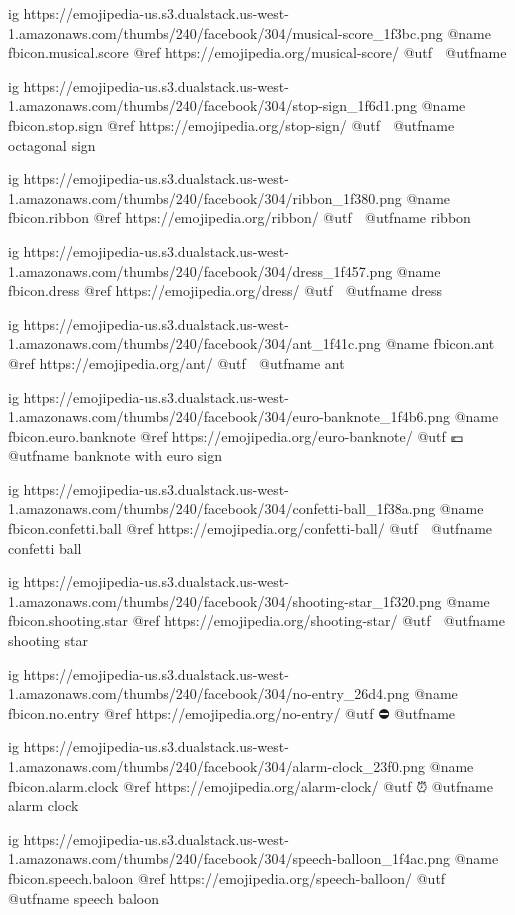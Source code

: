   ig https://emojipedia-us.s3.dualstack.us-west-1.amazonaws.com/thumbs/240/facebook/304/musical-score_1f3bc.png
  @name fbicon.musical.score
  @ref https://emojipedia.org/musical-score/
  @utf 🎼
  @utfname

  ig https://emojipedia-us.s3.dualstack.us-west-1.amazonaws.com/thumbs/240/facebook/304/stop-sign_1f6d1.png
  @name fbicon.stop.sign
  @ref https://emojipedia.org/stop-sign/
  @utf 🛑
  @utfname octagonal sign

  ig https://emojipedia-us.s3.dualstack.us-west-1.amazonaws.com/thumbs/240/facebook/304/ribbon_1f380.png
  @name fbicon.ribbon
  @ref https://emojipedia.org/ribbon/
  @utf 🎀
  @utfname ribbon

  ig https://emojipedia-us.s3.dualstack.us-west-1.amazonaws.com/thumbs/240/facebook/304/dress_1f457.png
  @name fbicon.dress
  @ref https://emojipedia.org/dress/
  @utf 👗
  @utfname dress

  ig https://emojipedia-us.s3.dualstack.us-west-1.amazonaws.com/thumbs/240/facebook/304/ant_1f41c.png
  @name fbicon.ant
  @ref https://emojipedia.org/ant/
  @utf 🐜
  @utfname ant

  ig https://emojipedia-us.s3.dualstack.us-west-1.amazonaws.com/thumbs/240/facebook/304/euro-banknote_1f4b6.png
  @name fbicon.euro.banknote
  @ref https://emojipedia.org/euro-banknote/
  @utf 💶
  @utfname banknote with euro sign

  ig https://emojipedia-us.s3.dualstack.us-west-1.amazonaws.com/thumbs/240/facebook/304/confetti-ball_1f38a.png
  @name fbicon.confetti.ball
  @ref https://emojipedia.org/confetti-ball/
  @utf 🎊
  @utfname confetti ball

  ig https://emojipedia-us.s3.dualstack.us-west-1.amazonaws.com/thumbs/240/facebook/304/shooting-star_1f320.png
  @name fbicon.shooting.star
  @ref https://emojipedia.org/shooting-star/
  @utf 🌠
  @utfname shooting star

  ig https://emojipedia-us.s3.dualstack.us-west-1.amazonaws.com/thumbs/240/facebook/304/no-entry_26d4.png
  @name fbicon.no.entry
  @ref https://emojipedia.org/no-entry/
  @utf ⛔️
  @utfname

  ig https://emojipedia-us.s3.dualstack.us-west-1.amazonaws.com/thumbs/240/facebook/304/alarm-clock_23f0.png
  @name fbicon.alarm.clock
  @ref https://emojipedia.org/alarm-clock/
  @utf ⏰
  @utfname alarm clock

  ig https://emojipedia-us.s3.dualstack.us-west-1.amazonaws.com/thumbs/240/facebook/304/speech-balloon_1f4ac.png
  @name fbicon.speech.baloon
  @ref https://emojipedia.org/speech-balloon/
  @utf 💬
  @utfname speech baloon



